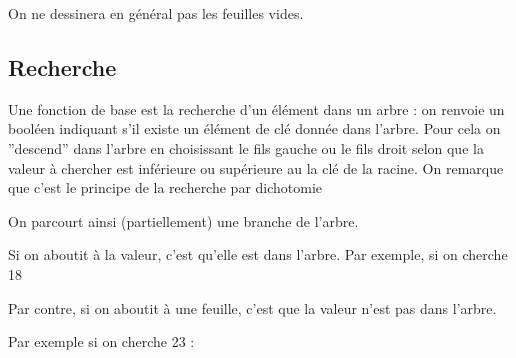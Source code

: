 On ne dessinera en général pas les feuilles vides.
\subsection{Recherche}
Une fonction de base est la recherche d'un élément dans un arbre : on renvoie un booléen indiquant s'il existe un élément de clé donnée dans l'arbre. Pour cela on ''descend'' dans l'arbre en choisissant le fils gauche ou le fils droit selon que la valeur à chercher est inférieure ou supérieure au la clé de la racine. On remarque que c'est le principe de la recherche par dichotomie

On parcourt ainsi (partiellement) une branche de l'arbre.

\medskip

Si on aboutit à la valeur, c'est qu'elle est dans l'arbre. Par exemple, si on cherche 18
\begin{center}
\end{center}

Par contre, si on aboutit à une feuille, c'est que la valeur n'est pas dans l'arbre. 

Par exemple si on cherche 23 :
\begin{center}
\end{center}

